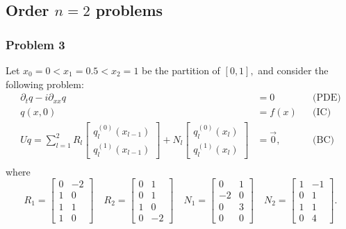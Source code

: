 \documentclass[11pt,reqno,oneside,a4paper]{article}
\theoremstyle{plain} %
\theoremstyle{definition}
\theoremstyle{remark}
\begin{document}
\subsection*{Order $n = 2$ problems}
\subsubsection*{Problem 3}
Let $x_0 = 0 < x_1  = 0.5 < x_2 = 1$ be the partition of $[0,1],$ and consider the following problem:
\begin{align*}
\partial_t q - i \partial_{xx} q &= 0 &&\text{(PDE)} \\
q(x, 0) &= f(x) &&\text{(IC)} \\
Uq = \sum^2_{l=1} R_l \begin{bmatrix} q_l^{(0)}(x_{l-1}) \\ q_l^{(1)}(x_{l-1}) \end{bmatrix} + N_l \begin{bmatrix} q_l^{(0)}(x_{l}) \\ q_l^{(1)}(x_{l}) \end{bmatrix} &= \vec{0}, &&\text{(BC)} \\
\end{align*}
where 
\begin{equation*}
R_1 = \begin{bmatrix} 0 & -2 \\ 1 & 0 \\ 1 & 1 \\ 1 & 0 \end{bmatrix} \quad R_2= \begin{bmatrix} 0 & 1  \\ 0 & 1 \\ 1 & 0 \\ 0 & -2 \end{bmatrix} \quad N_1 = \begin{bmatrix} 0 & 1 \\ -2 & 0 \\ 0 & 3 \\ 0 & 0  \end{bmatrix} \quad N_2 = \begin{bmatrix} 1 & -1 \\ 0 & 1 \\ 1 & 1 \\ 0 & 4 \end{bmatrix}.
\end{equation*}
\end{document}
